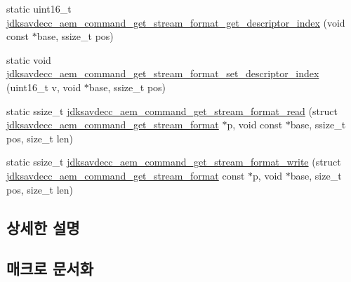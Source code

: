 \begin{DoxyCompactItemize}
\item 
static uint16\+\_\+t \hyperlink{group__command__get__stream__format_ga42f6bcc12158be16a354c3e2f26a33f3}{jdksavdecc\+\_\+aem\+\_\+command\+\_\+get\+\_\+stream\+\_\+format\+\_\+get\+\_\+descriptor\+\_\+index} (void const $\ast$base, ssize\+\_\+t pos)
\item 
static void \hyperlink{group__command__get__stream__format_ga1cf1aac97f30d02bac5200d99ca2df37}{jdksavdecc\+\_\+aem\+\_\+command\+\_\+get\+\_\+stream\+\_\+format\+\_\+set\+\_\+descriptor\+\_\+index} (uint16\+\_\+t v, void $\ast$base, ssize\+\_\+t pos)
\item 
static ssize\+\_\+t \hyperlink{group__command__get__stream__format_gae9b57d9a0ec5807956eb34c1aa8c7a19}{jdksavdecc\+\_\+aem\+\_\+command\+\_\+get\+\_\+stream\+\_\+format\+\_\+read} (struct \hyperlink{structjdksavdecc__aem__command__get__stream__format}{jdksavdecc\+\_\+aem\+\_\+command\+\_\+get\+\_\+stream\+\_\+format} $\ast$p, void const $\ast$base, ssize\+\_\+t pos, size\+\_\+t len)
\item 
static ssize\+\_\+t \hyperlink{group__command__get__stream__format_ga9195ddf9def8d3d66d0d516ed78df680}{jdksavdecc\+\_\+aem\+\_\+command\+\_\+get\+\_\+stream\+\_\+format\+\_\+write} (struct \hyperlink{structjdksavdecc__aem__command__get__stream__format}{jdksavdecc\+\_\+aem\+\_\+command\+\_\+get\+\_\+stream\+\_\+format} const $\ast$p, void $\ast$base, size\+\_\+t pos, size\+\_\+t len)
\end{DoxyCompactItemize}


\subsection{상세한 설명}


\subsection{매크로 문서화}
